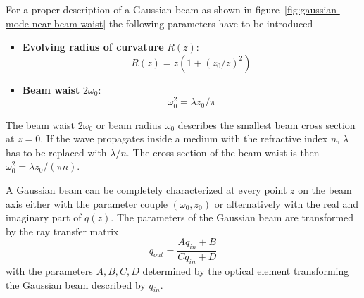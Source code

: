 For a proper description of a Gaussian beam as shown in figure~\ref{fig:gaussian-mode-near-beam-waist} the following  parameters have to be introduced
\begin{itemize}
	\item \textbf{Evolving radius of curvature} $R(z)$:
	\begin{equation}
	\label{eq:radius-wavefronts}
	R(z)=z(1+(z_0/z)^2)
	\end{equation}
	\item \textbf{Beam waist} $2\omega_0$:
	\begin{equation}
	\label{eq:beam-waist}
	\omega_0^2=\lambda z_0/\pi
	\end{equation}
\end{itemize}
The beam waist $2\omega_0$ or beam radius $\omega_0$ describes the smallest  beam cross section at $z=0$.
If the wave propagates inside a medium with the refractive index $n$, $\lambda$ has to be replaced with $\lambda/n$.
The cross section of the beam waist  is then $\omega_0^2=\lambda z_0/(\pi n)$.

A Gaussian beam can be completely characterized at every point $z$ on the beam axis either with the parameter couple $(\omega_0, z_0)$ or alternatively with the real and imaginary part of $q(z)$.
The parameters of the Gaussian beam are transformed by the ray transfer matrix
\begin{equation}
\label{eq:ABCD-rule}
q_{out}=\frac{A q_{in} + B}{C q_{in} + D}
\end{equation}
with the parameters $A, B, C, D$ determined by the optical element transforming the Gaussian beam described by $q_{in}$.

